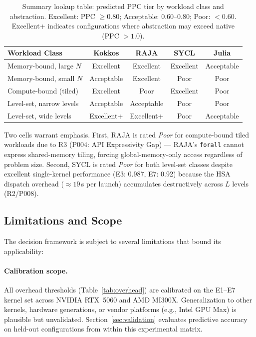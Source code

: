 \begin{table}[t]
\centering
\caption{Summary lookup table: predicted PPC tier by workload class and
abstraction. Excellent: PPC $\geq 0.80$; Acceptable: $0.60$--$0.80$;
Poor: $< 0.60$. Excellent+ indicates configurations where abstraction
may exceed native (PPC $> 1.0$).}
\label{tab:lookup}
\begin{tabular}{lcccc}
\hline
\textbf{Workload Class} & \textbf{Kokkos} & \textbf{RAJA}
& \textbf{SYCL} & \textbf{Julia} \\
\hline
Memory-bound, large $N$   & Excellent  & Excellent  & Excellent  & Acceptable \\
Memory-bound, small $N$   & Acceptable & Excellent  & Poor       & Poor       \\
Compute-bound (tiled)     & Excellent  & Poor       & Excellent  & Poor       \\
Level-set, narrow levels  & Acceptable & Acceptable & Poor       & Poor       \\
Level-set, wide levels    & Excellent+ & Excellent+ & Poor       & Acceptable \\
\hline
\end{tabular}
\end{table}

Two cells warrant emphasis. First, RAJA is rated \textit{Poor} for
compute-bound tiled workloads due to R3 (P004: API Expressivity Gap) ---
RAJA's \texttt{forall} cannot express shared-memory tiling, forcing
global-memory-only access regardless of problem size. Second, SYCL is rated
\textit{Poor} for both level-set classes despite excellent single-kernel
performance (E3: 0.987, E7: 0.92) because the HSA dispatch overhead
($\approx 19$\,\textmu{}s per launch) accumulates destructively across
$L$ levels (R2/P008).

\subsection{Limitations and Scope}
\label{subsec:limitations}

The decision framework is subject to several limitations that bound its
applicability:

\paragraph{Calibration scope.}
All overhead thresholds (Table~\ref{tab:overhead}) are calibrated on the
E1--E7 kernel set across NVIDIA RTX~5060 and AMD MI300X. Generalization to
other kernels, hardware generations, or vendor platforms (e.g., Intel GPU
Max) is plausible but unvalidated. Section~\ref{sec:validation} evaluates
predictive accuracy on held-out configurations from within this experimental
matrix.

